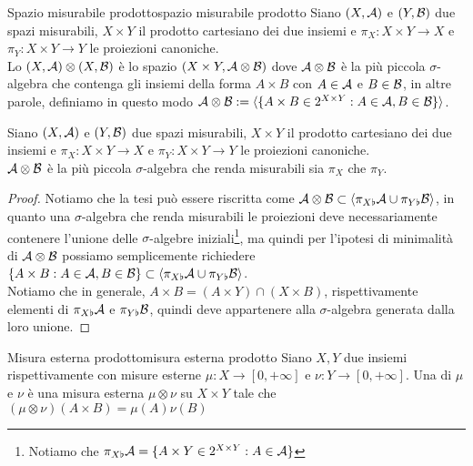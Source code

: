 \documentclass{article}
\renewcommand\A{\mc{A}}
\begin{document}
\begin{definition}{Spazio misurabile prodotto}{spazio misurabile prodotto}
    Siano $(X,\A)$ e $(Y,\mathcal{B})$ due spazi misurabili, $X\times Y$ il prodotto cartesiano dei due insiemi e $\pi_X : X\times Y \to X$ e $\pi_Y : X\times Y \to Y$ le proiezioni canoniche.\\
    Lo  $(X,\A)\otimes (X,\B)$ è lo spazio $(X\times Y, \A \otimes \B)$ dove $\A \otimes\B$ è la più piccola $\sigma$-algebra che contenga gli insiemi della forma $A\times B$ con $A \in \A$ e $B \in \mathcal{B}$, in altre parole, definiamo in questo modo $\A\otimes\B := \langle\{A\times B \in 2^{X\times Y} : A \in \A, B\in \B\}\rangle$.
\end{definition}
\begin{remark}{}{}
    Siano $(X,\A)$ e $(Y,\mathcal{B})$ due spazi misurabili, $X\times Y$ il prodotto cartesiano dei due insiemi e $\pi_X : X\times Y \to X$ e $\pi_Y : X\times Y \to Y$ le proiezioni canoniche.\\
    $\A \otimes \B$ è la più piccola $\sigma$-algebra che renda misurabili sia $\pi_X$ che $\pi_Y$.
    \begin{proof}
        Notiamo che la tesi può essere riscritta come $\A\otimes\B \subset \langle\pi_{X\flat} \A \cup \pi_{Y\flat} \B\rangle $, in quanto una $\sigma$-algebra che renda misurabili le proiezioni deve necessariamente contenere l'unione delle $\sigma$-algebre iniziali\footnote{Notiamo che $\pi_{X\flat}\A = \{A \times Y \in 2^{X\times Y} : A \in \A\}$}, ma quindi per l'ipotesi di minimalità di $\A\otimes\B$ possiamo semplicemente richiedere $\{A\times B : A \in \A, B \in \B\}\subset \langle\pi_{X\flat} \A \cup \pi_{Y\flat} \B\rangle$.\\
        Notiamo che in generale, $A \times B = (A\times Y) \cap (X \times B)$, rispettivamente elementi di $\pi_{X\flat} \A$ e $\pi_{Y\flat} \mathcal{B}$, quindi deve appartenere alla $\sigma$-algebra generata dalla loro unione.
    \end{proof}
\end{remark}

\begin{definition}{Misura esterna prodotto}{misura esterna prodotto}
    Siano $X,Y$ due insiemi rispettivamente con misure esterne $\mu : X \to [0,+\infty]$ e $\nu: Y \to [0,+\infty]$. Una  di $\mu$ e $\nu$ è una misura esterna $\mu \otimes \nu$ su $X\times Y$ tale che $(\mu \otimes \nu)(A \times B) = \mu(A)\nu(B) $
\end{definition}
\end{document}
